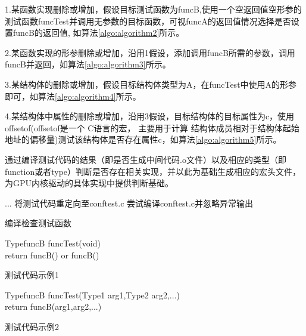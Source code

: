 1.某函数实现删除或增加，假设目标测试函数为funcB,使用一个空返回值空形参的测试函数funcTest并调用无参数的目标函数，可视funcA的返回值情况选择是否设置funcB的返回值,
如算法\ref{algo:algorithm2}所示。

2.某函数实现的形参删除或增加，沿用1假设，添加调用funcB所需的参数，调用funcB并返回，如算法\ref{algo:algorithm3}所示。

3.某结构体的删除或增加，假设目标结构体类型为A，在funcTest中使用A的形参即可，如算法\ref{algo:algorithm4}所示。

4.某结构体中属性的删除或增加，沿用3假设，目标结构体的目标属性为c，使用offsetof(offsetof是一个 C语言的宏，
主要用于计算 结构体成员相对于结构体起始地址的偏移量)测试该结构体是否存在属性c，如算法\ref{algo:algorithm5}所示。

通过编译测试代码的结果（即是否生成中间代码.o文件）以及相应的类型（即function或者type）判断是否存在相关实现，并以此为基础生成相应的宏头文件，为GPU内核驱动的具体实现中提供判断基础。

\begin{algorithm}[h]
  \SetAlgoLined
  ...\;
  将测试代码重定向至conftest.c\;
  尝试编译conftest.c并忽略异常输出\;
  \caption{编译检查测试函数}
  \label{algo:algorithm1}
\end{algorithm}

\begin{minipage}{0.45\textwidth}
  \begin{algorithm}[H]
    \SetAlgoLined
    TypefuncB funcTest(void){\\
      return funcB()\;
      or \;
      funcB()\;
    }
    \caption{测试代码示例1}
    \label{algo:algorithm2}
  \end{algorithm}
\end{minipage}
\hfill
\begin{minipage}{0.45\textwidth}
  \begin{algorithm}[H]
    \SetAlgoLined
    TypefuncB funcTest(Type1 arg1,Type2 arg2,...){\\
      return funcB(arg1,arg2,...)\;
    }
    \caption{测试代码示例2}
    \label{algo:algorithm3}
  \end{algorithm}
\end{minipage}

